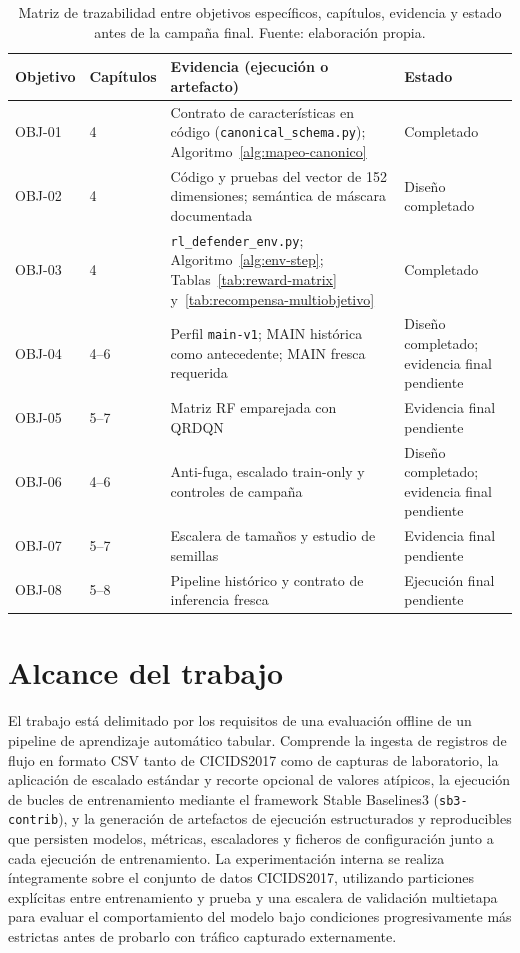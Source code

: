 \begin{table}[htbp]
\centering
\footnotesize
\setlength{\tabcolsep}{3pt}
\begin{tabular}{p{1.35cm}p{2.05cm}p{5.7cm}p{3.15cm}}
\toprule
Objetivo & Capítulos & Evidencia (ejecución o artefacto) & Estado \\
\midrule
OBJ-01 & 4 & Contrato de características en código (\texttt{canonical\_schema.py}); Algoritmo~\ref{alg:mapeo-canonico} & Completado \\
OBJ-02 & 4 & Código y pruebas del vector de 152 dimensiones; semántica de máscara documentada & Diseño completado \\
OBJ-03 & 4 & \texttt{rl\_defender\_env.py}; Algoritmo~\ref{alg:env-step}; Tablas~\ref{tab:reward-matrix} y~\ref{tab:recompensa-multiobjetivo} & Completado \\
OBJ-04 & 4--6 & Perfil \texttt{main-v1}; MAIN histórica como antecedente; MAIN fresca requerida & Diseño completado; evidencia final pendiente \\
OBJ-05 & 5--7 & Matriz RF emparejada con QRDQN & Evidencia final pendiente \\
OBJ-06 & 4--6 & Anti-fuga, escalado train-only y controles de campaña & Diseño completado; evidencia final pendiente \\
OBJ-07 & 5--7 & Escalera de tamaños y estudio de semillas & Evidencia final pendiente \\
OBJ-08 & 5--8 & Pipeline histórico y contrato de inferencia fresca & Ejecución final pendiente \\
\bottomrule
\end{tabular}
\caption[Matriz de trazabilidad de objetivos]{Matriz de trazabilidad entre objetivos específicos, capítulos, evidencia y estado antes de la campaña final. Fuente: elaboración propia.}
\label{tab:trazabilidad}
\end{table}

\section{Alcance del trabajo}
El trabajo está delimitado por los requisitos de una evaluación offline de un pipeline de aprendizaje automático tabular. Comprende la ingesta de registros de flujo en formato CSV tanto de CICIDS2017 como de capturas de laboratorio, la aplicación de escalado estándar y recorte opcional de valores atípicos, la ejecución de bucles de entrenamiento mediante el framework Stable Baselines3 (\texttt{sb3-contrib}), y la generación de artefactos de ejecución estructurados y reproducibles que persisten modelos, métricas, escaladores y ficheros de configuración junto a cada ejecución de entrenamiento. La experimentación interna se realiza íntegramente sobre el conjunto de datos CICIDS2017, utilizando particiones explícitas entre entrenamiento y prueba y una escalera de validación multietapa para evaluar el comportamiento del modelo bajo condiciones progresivamente más estrictas antes de probarlo con tráfico capturado externamente.

